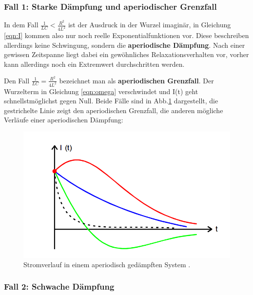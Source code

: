 \subsubsection{Fall 1: Starke Dämpfung und aperiodischer Grenzfall}
In dem Fall $\frac{1}{LC}<\frac{R^2}{4L^2}$ ist der Ausdruck in der
Wurzel imaginär, in Gleichung
\ref{eqn:I} kommen also nur noch reelle Exponentialfunktionen vor. Diese
beschreiben allerdings keine Schwingung, sondern die
\textbf{aperiodische Dämpfung}. Nach einer gewissen Zeitspanne liegt dabei ein
gewöhnliches Relaxationsverhalten vor, vorher kann allerdings noch ein Extremwert
durchschritten werden.

Den Fall $\frac{1}{LC}=\frac{R^2}{4L^2}$ bezeichnet man als
\textbf{aperiodischen Grenzfall}. Der Wurzelterm in Gleichung \ref{eqn:omega}
verschwindet und I(t) geht schnellstmöglichst gegen Null.
Beide Fälle sind in Abb.\ref{fig:aper} dargestellt, die gestrichelte Linie zeigt
den aperiodischen Grenzfall, die anderen mögliche Verläufe einer aperiodischen
Dämpfung:
\begin{figure}
  \centering
  \includegraphics{aperiode.png}
  \caption{Stromverlauf in einem aperiodisch gedämpften System
  \cite{officialmanual}.}
  \label{fig:aper}
\end{figure}

\subsubsection{Fall 2: Schwache Dämpfung}

